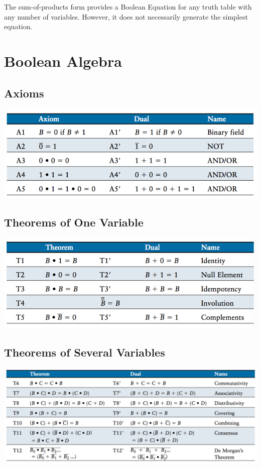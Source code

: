 \documentclass[12pt]{article}
\theoremstyle{definition}
\begin{document}
  The sum-of-products form provides a Boolean Equation for any truth table with any number of variables.
  However, it does not necessarily generate the simplest equation.

  \newpage
  \section{Boolean Algebra}
  \subsection{Axioms}
  \includegraphics[scale=0.7]{pictures/booleanAlgAxiom.png}

  \subsection{Theorems of One Variable}
  \includegraphics[scale=0.7]{pictures/booleanAlgOneVari.png}

  \subsection{Theorems of Several Variables}
  \includegraphics[scale=0.65]{pictures/booleanAlgMultVar.png}
\end{document}

